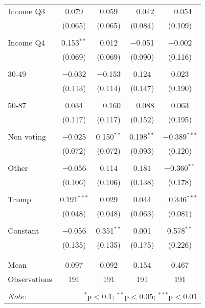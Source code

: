 \begin{tabular}{@{\extracolsep{5pt}}lcccc}
 Income Q3 & 0.079 & 0.059 & $-$0.042 & $-$0.054 \\ 
  & (0.065) & (0.065) & (0.084) & (0.109) \\ 
  & & & & \\ 
 Income Q4 & 0.153$^{**}$ & 0.012 & $-$0.051 & $-$0.002 \\ 
  & (0.069) & (0.069) & (0.090) & (0.116) \\ 
  & & & & \\ 
 30-49 & $-$0.032 & $-$0.153 & 0.124 & 0.023 \\ 
  & (0.113) & (0.114) & (0.147) & (0.190) \\ 
  & & & & \\ 
 50-87 & 0.034 & $-$0.160 & $-$0.088 & 0.063 \\ 
  & (0.117) & (0.117) & (0.152) & (0.195) \\ 
  & & & & \\ 
 Non voting & $-$0.025 & 0.150$^{**}$ & 0.198$^{**}$ & $-$0.389$^{***}$ \\ 
  & (0.072) & (0.072) & (0.093) & (0.120) \\ 
  & & & & \\ 
 Other & $-$0.056 & 0.114 & 0.181 & $-$0.360$^{**}$ \\ 
  & (0.106) & (0.106) & (0.138) & (0.178) \\ 
  & & & & \\ 
 Trump & 0.191$^{***}$ & 0.029 & 0.044 & $-$0.346$^{***}$ \\ 
  & (0.048) & (0.048) & (0.063) & (0.081) \\ 
  & & & & \\ 
 Constant & $-$0.056 & 0.351$^{**}$ & 0.001 & 0.578$^{**}$ \\ 
  & (0.135) & (0.135) & (0.175) & (0.226) \\ 
  & & & & \\ 
\hline \\[-1.8ex] 
Mean & 0.097 & 0.092 & 0.154 & 0.467 \\ 
Observations & 191 & 191 & 191 & 191 \\ 
\hline 
\hline \\[-1.8ex] 
\textit{Note:}  & \multicolumn{4}{r}{$^{*}$p$<$0.1; $^{**}$p$<$0.05; $^{***}$p$<$0.01} \\ 
\end{tabular} 
